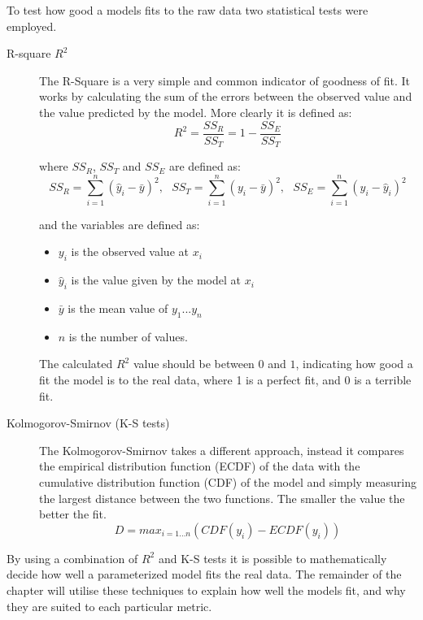 To test how good a models fits to the raw data two statistical tests were employed.

\begin{description}
  \item[R-square $R^2$]

    The R-Square is a very simple and common indicator of goodness of fit. It works by calculating the sum of the errors between the observed value and the value predicted by the model. More clearly it is defined as:
    \begin{equation}
        R^{2} = \frac{SS_{R}}{SS_{T}} = 1 - \frac{SS_{E}}{SS_{T}}
    \end{equation}

    where $SS_{R}$, $SS_{T}$ and $SS_{E}$ are defined as:
    \begin{equation}
        SS_{R} = \sum_{i=1}^n (\hat{y}_{i} - \bar{y})^{2}, ~~~
        SS_{T} = \sum_{i=1}^n (y_{i} - \bar{y})^{2}, ~~~
        SS_{E} = \sum_{i=1}^n (y_{i} - \hat{y}_{i})^{2}
    \end{equation}

    and the variables are defined as:
    \begin{itemize}
      \item $y_{i}$ is the observed value at $x_{i}$
      \item $\hat{y}_{i}$ is the value given by the model at $x_{i}$
      \item $\bar{y}$ is the mean value of $y_{1}...y_{n}$
      \item $n$ is the number of values.
    \end{itemize}

    The calculated $R^2$ value should be between $0$ and $1$, indicating how good a fit the model is to the real data, where 1 is a perfect fit, and 0 is a terrible fit.

  \item[Kolmogorov-Smirnov (K-S tests)]

    The Kolmogorov-Smirnov takes a different approach, instead it compares the empirical distribution function
(ECDF) of the data with the cumulative distribution function (CDF) of the model and simply measuring the largest distance between the two functions. The smaller the value the better the fit.
    \begin{equation}
        D = max_{i=1...n} ( CDF(y_{i}) - ECDF(y_{i}) )
    \end{equation}
\end{description}
By using a combination of $R^2$ and K-S tests it is possible to mathematically decide how well a parameterized model fits the real data. The remainder of the chapter will utilise these techniques to explain how well the models fit, and why they are suited to each particular metric.

